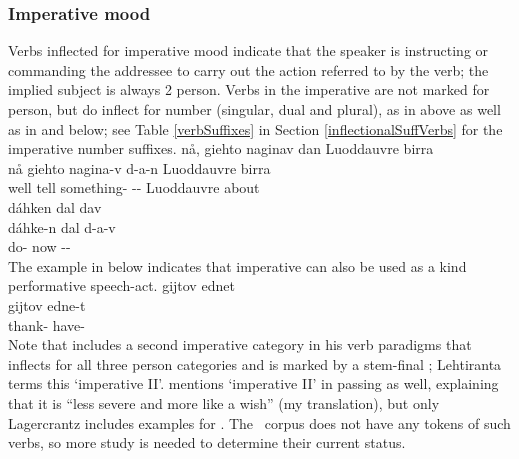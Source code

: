 \subsubsection{Imperative mood}\label{IMPmood}
Verbs inflected for imperative mood indicate that the speaker is instructing or commanding the addressee to carry out the action referred to by the verb; the implied subject is always 2 person. Verbs in the imperative are not marked for person, but do inflect for number (singular, dual and plural), as in  above as well as in  and  below; see Table \vref{verbSuffixes} in Section \ref{inflectionalSuffVerbs} for the imperative number suffixes. %
\ea\label{imperativeEx1}%
\glll	nå, giehto naginav dan Luoddauvre birra\\
	nå giehto nagina-v d-a-n Luoddauvre birra\\
	well tell\BS{} something- -- Luoddauvre\BS{} about\\\nopagebreak
{}	
\z
\ea\label{imperativeEx2}%
\glll	dáhken dal dav\\
	dáhke-n dal d-a-v\\
	do- now --\\\nopagebreak
{}	
\z
The example in  below indicates that imperative can also be used as a kind performative speech-act. 
\ea\label{imperativeEx3}%
\glll	gijtov ednet\\
	gijtov edne-t\\
	thank- have-\\\nopagebreak
{}	
\z
Note that \citet[150-155]{Lehtiranta1992} includes  a second imperative category in his verb paradigms that inflects for all three person categories and is marked by a stem-final ; Lehtiranta terms this ‘imperative II’. \citet[22]{Lagercrantz1926} mentions ‘imperative II’ in passing as well, explaining that it is “less severe and more like a wish” (my translation), but only Lagercrantz includes examples for \SGs. %
The \PSDP\ corpus does not have any tokens of such verbs, so more study is needed to determine their current status. 

